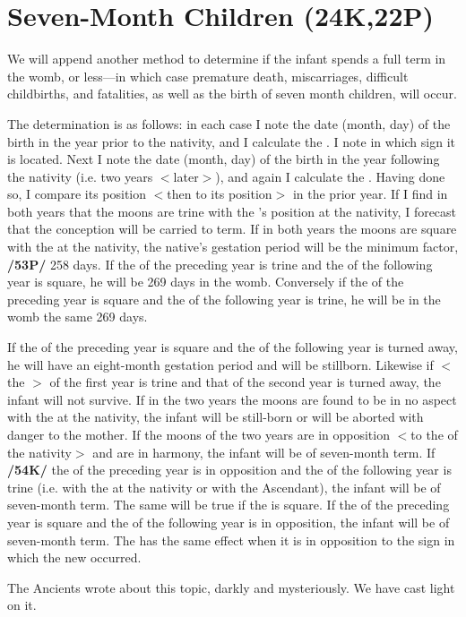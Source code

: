 \section{Seven-Month Children (24K,22P)}

We will append another method to determine if the infant spends a full term in the womb, or less—in which case premature death, miscarriages, difficult childbirths, and fatalities, as well as the birth of seven month children, will occur. 

The determination is as follows: in each case I note the date (month, day) of the birth in the year prior to the nativity, and I calculate the \Moon. I note in which sign it is located.
Next I note the date (month, day) of the birth in the year following the nativity (i.e. two years $<$later$>$), and
again I calculate the \Moon. Having done so, I compare its position $<$then to its position$>$ in the prior year. If I find in both years that the moons are trine with the \Moon’s position at the nativity, I forecast that the conception will be carried to term. If in both years the moons are square with the \Moon\xspace at the nativity, the native’s gestation period will be the minimum factor, \textbf{/53P/} 258 days. If the \Moon\xspace of the preceding year is trine and the \Moon\xspace of the following year is square, he will be 269 days in the womb. Conversely if the \Moon\xspace of the preceding year is square and the \Moon\xspace of the following year is trine, he will be in the womb the same 269 days.

If the \Moon\xspace of the preceding year is square and the \Moon\xspace of the following year is turned away, he will
have an eight-month gestation period and will be stillborn. Likewise if $<$the \Moon$>$ of the first year is trine and that of the second year is turned away, the infant will not survive. If in the two years the moons are found to be in no aspect with the \Moon\xspace at the nativity, the infant will be still-born or will be aborted with danger to the mother. If the moons of the two years are in opposition $<$to the \Moon\xspace of the nativity$>$ and are in harmony, the infant will be of seven-month term. If \textbf{/54K/} the \Moon\xspace of the preceding year is in opposition and the \Moon\xspace of the following year is trine (i.e. with the \Moon\xspace at the nativity or with the Ascendant), the infant will be of seven-month term. The same will be true if the \Moon\xspace is square. If the \Moon\xspace of the preceding year is square and the \Moon\xspace of the following year is in opposition, the infant will be of seven-month term. The \Sun\xspace has the same effect when it is in opposition to the sign in which the new \Moon\xspace occurred.

The Ancients wrote about this topic, darkly and mysteriously. We have cast light on it.

\newpage